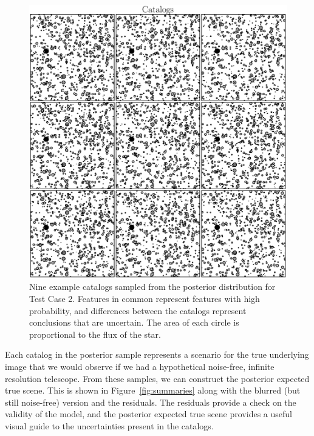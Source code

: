 \documentclass[12pt, preprint]{aastex}
\begin{document}
\begin{figure}[ht!]
\begin{center}
\includegraphics[scale=0.6]{Figures/catalogs.eps}
\end{center}
\caption{Nine example catalogs sampled from the posterior distribution for
Test Case 2. Features in common represent features with high probability,
and differences between the catalogs represent conclusions that are uncertain.
The area of each circle is proportional to the flux of the star.\label{fig:catalogs}}
\end{figure}

Each catalog in the posterior sample represents a scenario for the true
underlying image that we would observe if we had a hypothetical noise-free,
infinite resolution telescope. From these samples, we can construct the
posterior expected true scene. This is shown in Figure~\ref{fig:summaries} along
with the blurred (but still noise-free) version and the residuals. The residuals
provide a check on the validity of the model, and the posterior expected true
scene provides a useful visual guide to the uncertainties present in the catalogs.
\end{document}
